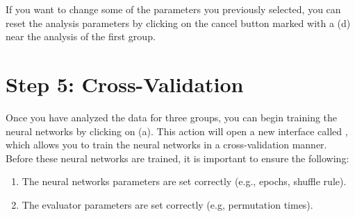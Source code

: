\documentclass[justified]{tufte-handout}
\begin{document}
{If you want to change some of the parameters you previously selected, you can reset the analysis parameters by clicking on the cancel button marked with a  (d) near the analysis of the first group.
 
\clearpage
\section{Step 5: Cross-Validation}

Once you have analyzed the data for three groups, you can begin training the neural networks by clicking on  (a). 
This action will open a new interface called , which allows you to train the neural networks in a cross-validation manner.
Before these neural networks are trained, it is important to ensure the following: 
\begin{enumerate}
	\item The neural networks parameters are set correctly (e.g., epochs, shuffle rule).
	\item The evaluator parameters are set correctly (e.g, permutation times).
\end{enumerate}


}
\end{document}
